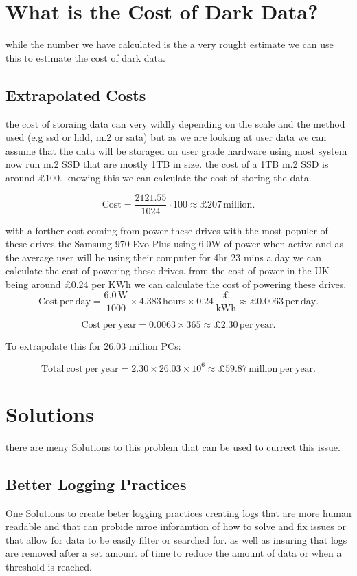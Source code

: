 \documentclass{article}
\begin{document}
\section{What is the Cost of Dark Data?}
while the number we have calculated is the a very rought estimate we can use this to estimate the cost of dark data.

\subsection{Extrapolated Costs}
the cost of storaing data can very wildly depending on the scale and the method used (e.g ssd or hdd, m.2 or sata) but as we are looking at user data we can 
assume that the data will be storaged on user grade hardware using most system now run m.2 SSD that are mostly 1TB in size. the cost of a 1TB m.2 SSD is around 
\pounds100. knowing this we can calculate the cost of storing the data.

\[
\mathrm{Cost} = \frac{2121.55}{1024} \cdot 100 \approx \pounds207 \, \mathrm{million}.
\]

with a forther cost coming from power these drives with the most populer of these drives the Samsung 970 Evo Plus using 6.0W of power when active and as the 
average user will be using their computer for 4hr 23 mins a day \parencite{ukom2024online} we can calculate the cost of powering these drives. from the cost of power in the UK being around
\pounds0.24 per KWh we can calculate the cost of powering these drives. \parencite{ofgem2022powercost}
\[
\mathrm{Cost \ per \ day} = \frac{6.0 \, \mathrm{W}}{1000} \times 4.383 \, \mathrm{hours} \times 0.24 \, \frac{\pounds}{\mathrm{kWh}} \approx \pounds 0.0063 \, \mathrm{per \ day}.
\]

\[
\mathrm{Cost \ per \ year} = 0.0063 \times 365 \approx \pounds 2.30 \, \mathrm{per \ year}.
\]

To extrapolate this for 26.03 million PCs:

\[
\mathrm{Total \ cost \ per \ year} = 2.30 \times 26.03 \times 10^6 \approx \pounds 59.87 \, \mathrm{million \ per \ year}.
\]

\section{Solutions}
there are meny Solutions to this problem that can be used to currect this issue.

\subsection{Better Logging Practices}
One Solutions to create beter logging practices creating logs that are more human readable and that can probide mroe inforamtion of how to solve and fix issues
or that allow for data to be easily filter or searched for. as well as insuring that logs are removed after a set amount of time to reduce the amount of data
or when a threshold is reached.
\end{document}
